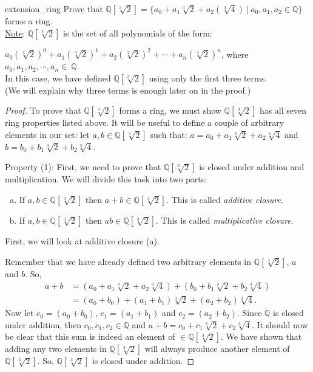 \begin{example}{extension_ring}
Prove that ${\mathbb Q}[\sqrt[3]{2}]=\{a_0+a_1\sqrt[3]{2}+a_2(\sqrt[3]{4})~|~a_0,a_1,a_2\in {\mathbb Q}\}$ forms a ring.\\

\underline{Note}: ${\mathbb Q}[\sqrt[3]{2}]$ is the set of all polynomials of the form:

$a_0(\sqrt[3]{2})^0+a_1(\sqrt[3]{2})^1+a_2(\sqrt[3]{2})^2+\cdots+a_n(\sqrt[3]{2})^n$, where $a_0,a_1,a_2,\cdots,a_n\in~{\mathbb Q}$.\\

In this case, we have defined ${\mathbb Q}[\sqrt[3]{2}]$ using only the first three terms.\\ 
(We will explain why three terms is enough later on in the proof.) \\

\begin{proof}
To prove that ${\mathbb Q}[\sqrt[3]{2}]$ forms a ring, we must show ${\mathbb Q}[\sqrt[3]{2}]$ has all seven ring properties listed above. It will be useful to define a couple of arbitrary elements in our set:
let $a,b\in{\mathbb Q}[\sqrt[3]{2}]$ such that:
$a=a_0+a_1\sqrt[3]{2}+a_2\sqrt[3]{4}$ and $b=b_0+b_1\sqrt[3]{2}+b_2\sqrt[3]{4}$.
\medskip

Property (1):  First, we need to prove that ${\mathbb Q}[\sqrt[3]{2}]$ is closed under addition and multiplication. We will divide this task into two parts:
\begin{enumerate}[(a)]

\item If $a,b\in{\mathbb Q}[\sqrt[3]{2}]$ then $a+b\in {\mathbb Q}[\sqrt[3]{2}]$. This is called \emph{additive closure}.
\item If $a,b\in{\mathbb Q}[\sqrt[3]{2}]$ then $ab\in {\mathbb Q}[\sqrt[3]{2}]$. This is called \emph{multiplicative closure}.
\end{enumerate}
First, we will look at additive closure (a).

Remember that we have already defined two arbitrary elements in ${\mathbb Q}[\sqrt[3]{2}]$, $a$ and $b$. So,
\begin{align*}
a+b&=(a_0+a_1\sqrt[3]{2}+a_2\sqrt[3]{4})+(b_0+b_1\sqrt[3]{2}+b_2\sqrt[3]{4})\\
&=(a_0+b_0)+(a_1+b_1)\sqrt[3]{2}+(a_2+b_2)\sqrt[3]{4}.
\end{align*}
Now let $c_0=(a_0+b_0)$, $c_1=(a_1+b_1)$ and $c_2=(a_2+b_2)$. Since ${\mathbb Q}$ is closed under addition, then $c_0,c_1,c_2\in{\mathbb Q}$ and $a+b=c_0+c_1\sqrt[3]{2}+c_2\sqrt[3]{4}.$ It should now be clear that this sum is indeed an element of $\in{\mathbb Q}[\sqrt[3]{2}]$. We have shown that adding any two elements in ${\mathbb Q}[\sqrt[3]{2}]$ will always produce another element of ${\mathbb Q}[\sqrt[3]{2}]$. So, ${\mathbb Q}[\sqrt[3]{2}]$ is closed under addition.


\end{proof}
\end{example}
